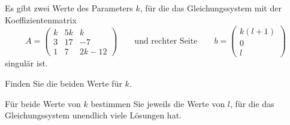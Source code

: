 Es gibt zwei Werte des Parameters $k$, für die 
das Gleichungssystem mit der Koeffizientenmatrix
\[
A=\begin{pmatrix}
 k& 5k&    k  \\
 3& 17&   -7  \\
 1&  7& 2k -12
\end{pmatrix}
\qquad\text{und rechter Seite}\qquad
b=\begin{pmatrix}
k(l+1)\\0\\l
\end{pmatrix}
\]
singulär ist.
\begin{teilaufgaben}
\item Finden Sie die beiden Werte für $k$.
\item Für beide Werte von $k$ bestimmen Sie jeweils die Werte von $l$,
für die das Gleichungssystem unendlich viele Lösungen hat.
\end{teilaufgaben}

